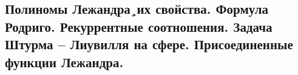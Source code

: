 \subsection{Полиномы Лежандра¸их свойства. Формула Родриго. Рекуррентные соотношения. Задача Штурма – Лиувилля на сфере. Присоединенные функции Лежандра.}
